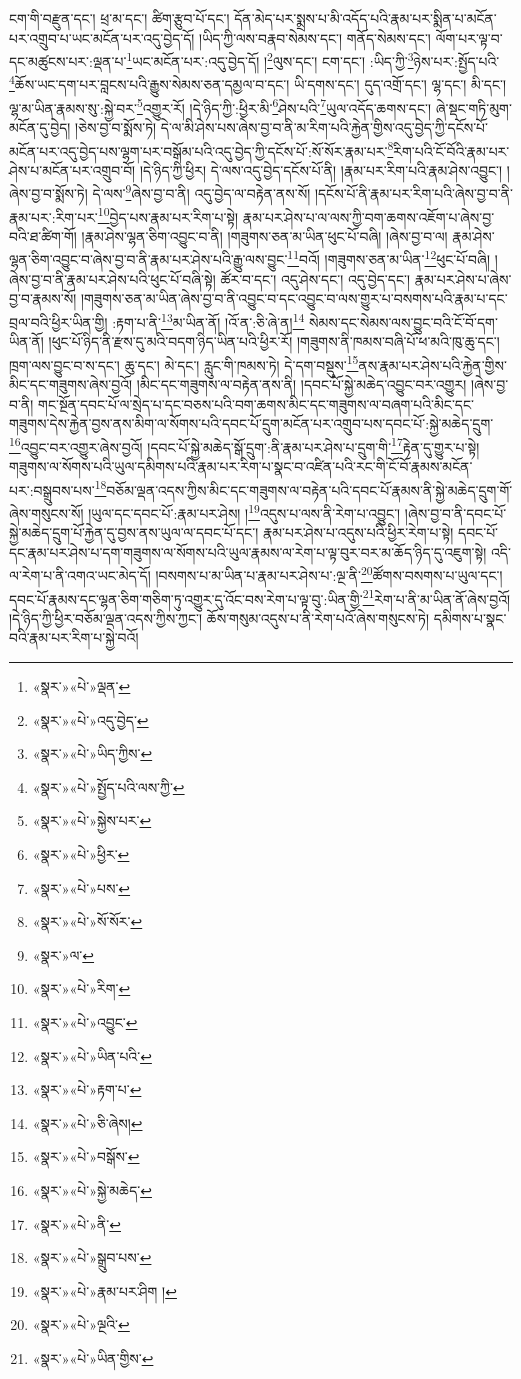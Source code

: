 ངག་གི་བརྫུན་དང་། ཕྲ་མ་དང་། ཚིག་རྩུབ་པོ་དང་། དོན་མེད་པར་སྨྲས་པ་མི་འདོད་པའི་རྣམ་པར་སྨིན་པ་མངོན་པར་འགྲུབ་པ་ཡང་མངོན་པར་འདུ་བྱེད་དོ། །ཡིད་ཀྱི་ལས་བརྣབ་སེམས་དང་། གནོད་སེམས་དང་། ལོག་པར་ལྟ་བ་དང་མཚུངས་པར་:ལྡན་པ་\footnote{«སྣར་»«པེ་»ལྡན་}ཡང་མངོན་པར་:འདུ་བྱེད་དོ། །\footnote{«སྣར་»«པེ་»འདུ་བྱེད་}ལུས་དང་། ངག་དང་། :ཡིད་ཀྱི་\footnote{«སྣར་»«པེ་»ཡིད་ཀྱིས་}ཉེས་པར་:སྤྱོད་པའི་\footnote{«སྣར་»«པེ་»སྤྱོད་པའི་ལས་ཀྱི་}ཆོས་ཡང་དག་པར་བླངས་པའི་རྒྱུས་སེམས་ཅན་དམྱལ་བ་དང་། ཡི་དགས་དང་། དུད་འགྲོ་དང་། ལྷ་དང་། མི་དང་། ལྷ་མ་ཡིན་རྣམས་སུ་:སྐྱེ་བར་\footnote{«སྣར་»«པེ་»སྐྱེས་པར་}འགྱུར་རོ། །དེ་ཉིད་ཀྱི་:ཕྱིར་མི་\footnote{«སྣར་»«པེ་»ཕྱིར་}ཤེས་པའི་\footnote{«སྣར་»«པེ་»པས་}ཡུལ་འདོད་ཆགས་དང་། ཞེ་སྡང་གཏི་མུག་མངོན་དུ་བྱེད། །ཅེས་བྱ་བ་སྨོས་ཏེ། དེ་ལ་མི་ཤེས་པས་ཞེས་བྱ་བ་ནི་མ་རིག་པའི་རྐྱེན་གྱིས་འདུ་བྱེད་ཀྱི་དངོས་པོ་མངོན་པར་འདུ་བྱེད་པས་ལྷག་པར་བསྒོམ་པའི་འདུ་བྱེད་ཀྱི་དངོས་པོ་:སོ་སོར་རྣམ་པར་\footnote{«སྣར་»«པེ་»སོ་སོར་}རིག་པའི་ངོ་བོའི་རྣམ་པར་ཤེས་པ་མངོན་པར་འགྲུབ་བོ། །དེ་ཉིད་ཀྱི་ཕྱིར། དེ་ལས་འདུ་བྱེད་དངོས་པོ་ནི། །རྣམ་པར་རིག་པའི་རྣམ་ཤེས་འབྱུང་། །ཞེས་བྱ་བ་སྨོས་ཏེ། དེ་ལས་\footnote{«སྣར་»ལ་}ཞེས་བྱ་བ་ནི། འདུ་བྱེད་ལ་བརྟེན་ནས་སོ། །དངོས་པོ་ནི་རྣམ་པར་རིག་པའི་ཞེས་བྱ་བ་ནི་རྣམ་པར་:རིག་པར་\footnote{«སྣར་»«པེ་»རིག་}བྱེད་པས་རྣམ་པར་རིག་པ་སྟེ། རྣམ་པར་ཤེས་པ་ལ་ལས་ཀྱི་བག་ཆགས་འཇོག་པ་ཞེས་བྱ་བའི་ཐ་ཚིག་གོ། །རྣམ་ཤེས་ལྷན་ཅིག་འབྱུང་བ་ནི། །གཟུགས་ཅན་མ་ཡིན་ཕུང་པོ་བཞི། །ཞེས་བྱ་བ་ལ། རྣམ་ཤེས་ལྷན་ཅིག་འབྱུང་བ་ཞེས་བྱ་བ་ནི་རྣམ་པར་ཤེས་པའི་རྒྱུ་ལས་བྱུང་\footnote{«སྣར་»«པེ་»འབྱུང་}བའོ། །གཟུགས་ཅན་མ་ཡིན་\footnote{«སྣར་»«པེ་»ཡིན་པའི་}ཕུང་པོ་བཞི། །ཞེས་བྱ་བ་ནི་རྣམ་པར་ཤེས་པའི་ཕུང་པོ་བཞི་སྟེ། ཚོར་བ་དང་། འདུ་ཤེས་དང་། འདུ་བྱེད་དང་། རྣམ་པར་ཤེས་པ་ཞེས་བྱ་བ་རྣམས་སོ། །གཟུགས་ཅན་མ་ཡིན་ཞེས་བྱ་བ་ནི་འབྱུང་བ་དང་འབྱུང་བ་ལས་གྱུར་པ་བསགས་པའི་རྣམ་པ་དང་བྲལ་བའི་ཕྱིར་ཡིན་གྱི། :རྟག་པ་ནི་\footnote{«སྣར་»«པེ་»རྟག་པ་}མ་ཡིན་ནོ། །འོ་ན་:ཅི་ཞེ་ན།\footnote{«སྣར་»«པེ་»ཅི་ཞེས།} སེམས་དང་སེམས་ལས་བྱུང་བའི་ངོ་བོ་དག་ཡིན་ནོ། །ཕུང་པོ་ཉིད་ནི་རྫས་དུ་མའི་བདག་ཉིད་ཡིན་པའི་ཕྱིར་རོ། །གཟུགས་ནི་ཁམས་བཞི་པོ་ཕ་མའི་ཁུ་ཆུ་དང་། ཁྲག་ལས་བྱུང་བ་ས་དང་། ཆུ་དང་། མེ་དང་། རླུང་གི་ཁམས་ཏེ། དེ་དག་བསྡུས་\footnote{«སྣར་»«པེ་»བསྒོས་}ནས་རྣམ་པར་ཤེས་པའི་རྐྱེན་གྱིས་མིང་དང་གཟུགས་ཞེས་བྱའོ། །མིང་དང་གཟུགས་ལ་བརྟེན་ནས་ནི། །དབང་པོ་སྐྱེ་མཆེད་འབྱུང་བར་འགྱུར། །ཞེས་བྱ་བ་ནི། གང་སྔོན་དབང་པོ་ལ་སྲེད་པ་དང་བཅས་པའི་བག་ཆགས་མིང་དང་གཟུགས་ལ་བཞག་པའི་མིང་དང་གཟུགས་དེས་རྐྱེན་བྱས་ནས་མིག་ལ་སོགས་པའི་དབང་པོ་དྲུག་མངོན་པར་འགྲུབ་པས་དབང་པོ་:སྐྱེ་མཆེད་དྲུག་\footnote{«སྣར་»«པེ་»སྐྱེ་མཆེད་}འབྱུང་བར་འགྱུར་ཞེས་བྱའོ། །དབང་པོ་སྐྱེ་མཆེད་སྒོ་དྲུག་:ནི་རྣམ་པར་ཤེས་པ་དྲུག་གི་\footnote{«སྣར་»«པེ་»ནི་}རྟེན་དུ་གྱུར་པ་སྟེ། གཟུགས་ལ་སོགས་པའི་ཡུལ་དམིགས་པའི་རྣམ་པར་རིག་པ་སྣང་བ་འཛིན་པའི་རང་གི་ངོ་བོ་རྣམས་མངོན་པར་:བསྒྲུབས་པས་\footnote{«སྣར་»«པེ་»སྒྲུབ་པས་}བཅོམ་ལྡན་འདས་ཀྱིས་མིང་དང་གཟུགས་ལ་བརྟེན་པའི་དབང་པོ་རྣམས་ནི་སྐྱེ་མཆེད་དྲུག་གོ་ཞེས་གསུངས་སོ། །ཡུལ་དང་དབང་པོ་:རྣམ་པར་ཤེས། །\footnote{«སྣར་»«པེ་»རྣམ་པར་ཤིག །}འདུས་པ་ལས་ནི་རེག་པ་འབྱུང་། །ཞེས་བྱ་བ་ནི་དབང་པོ་སྐྱེ་མཆེད་དྲུག་པོ་རྐྱེན་དུ་བྱས་ནས་ཡུལ་ལ་དབང་པོ་དང་། རྣམ་པར་ཤེས་པ་འདུས་པའི་ཕྱིར་རེག་པ་སྟེ། དབང་པོ་དང་རྣམ་པར་ཤེས་པ་དག་གཟུགས་ལ་སོགས་པའི་ཡུལ་རྣམས་ལ་རེག་པ་ལྟ་བུར་བར་མ་ཆོད་ཉིད་དུ་འཇུག་སྟེ། འདི་ལ་རེག་པ་ནི་འགའ་ཡང་མེད་དོ། །བསགས་པ་མ་ཡིན་པ་རྣམ་པར་ཤེས་པ་:ལྔ་ནི་\footnote{«སྣར་»«པེ་»ལྔའི་}ཚོགས་བསགས་པ་ཡུལ་དང་། དབང་པོ་རྣམས་དང་ལྷན་ཅིག་གཅིག་ཏུ་འགྱུར་དུ་འོང་བས་རེག་པ་ལྟ་བུ་:ཡིན་གྱི་\footnote{«སྣར་»«པེ་»ཡིན་གྱིས་}རེག་པ་ནི་མ་ཡིན་ནོ་ཞེས་བྱའོ། །དེ་ཉིད་ཀྱི་ཕྱིར་བཅོམ་ལྡན་འདས་ཀྱིས་ཀྱང་། ཆོས་གསུམ་འདུས་པ་ནི་རེག་པའོ་ཞེས་གསུངས་ཏེ། དམིགས་པ་སྣང་བའི་རྣམ་པར་རིག་པ་སྐྱེ་བའོ། 